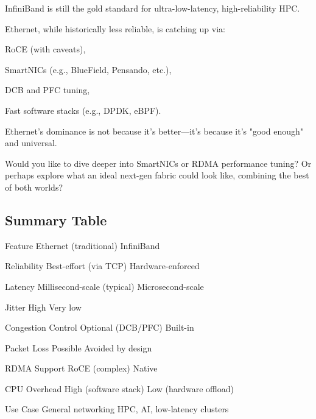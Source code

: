 InfiniBand is still the gold standard for ultra-low-latency, high-reliability HPC.

Ethernet, while historically less reliable, is catching up via:


RoCE (with caveats),

SmartNICs (e.g., BlueField, Pensando, etc.),

DCB and PFC tuning,

Fast software stacks (e.g., DPDK, eBPF).

Ethernet’s dominance is not because it’s better—it’s because it’s "good enough" and universal.

Would you like to dive deeper into SmartNICs or RDMA performance tuning? Or perhaps explore what an ideal next-gen fabric could look like, combining the best of both worlds?
 


 
\subsection{Summary Table}
 
Feature	Ethernet (traditional)	InfiniBand

Reliability	Best-effort (via TCP)	Hardware-enforced

Latency	Millisecond-scale (typical)	Microsecond-scale

Jitter	High	Very low

Congestion Control	Optional (DCB/PFC)	Built-in

Packet Loss	Possible	Avoided by design

RDMA Support	RoCE (complex)	Native

CPU Overhead	High (software stack)	Low (hardware offload)

Use Case	General networking	HPC, AI, low-latency clusters
